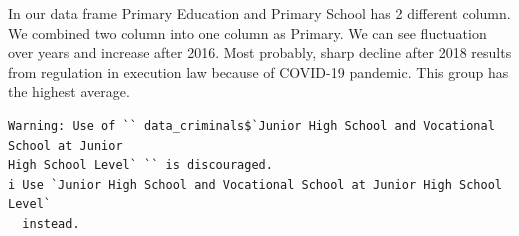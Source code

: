 \documentclass[
  11pt,
  a4paper,
  DIV=11,
  numbers=noendperiod]{scrartcl}
\newenvironment{Shaded}{\begin{snugshade}}{\end{snugshade}}
\newcommand{\AttributeTok}[1]{\textcolor[rgb]{0.40,0.45,0.13}{#1}}
\newcommand{\DecValTok}[1]{\textcolor[rgb]{0.68,0.00,0.00}{#1}}
\newcommand{\FunctionTok}[1]{\textcolor[rgb]{0.28,0.35,0.67}{#1}}
\newcommand{\NormalTok}[1]{\textcolor[rgb]{0.00,0.23,0.31}{#1}}
\newcommand{\OtherTok}[1]{\textcolor[rgb]{0.00,0.23,0.31}{#1}}
\newcommand{\SpecialCharTok}[1]{\textcolor[rgb]{0.37,0.37,0.37}{#1}}
\newcommand{\StringTok}[1]{\textcolor[rgb]{0.13,0.47,0.30}{#1}}
\begin{document}
In our data frame Primary Education and Primary School has 2 different
column. We combined two column into one column as Primary. We can see
fluctuation over years and increase after 2016. Most probably, sharp
decline after 2018 results from regulation in execution law because of
COVID-19 pandemic. This group has the highest average.

\begin{Shaded}
\end{Shaded}

\begin{verbatim}
Warning: Use of `` data_criminals$`Junior High School and Vocational School at Junior
High School Level` `` is discouraged.
i Use `Junior High School and Vocational School at Junior High School Level`
  instead.
\end{verbatim}
\end{document}
